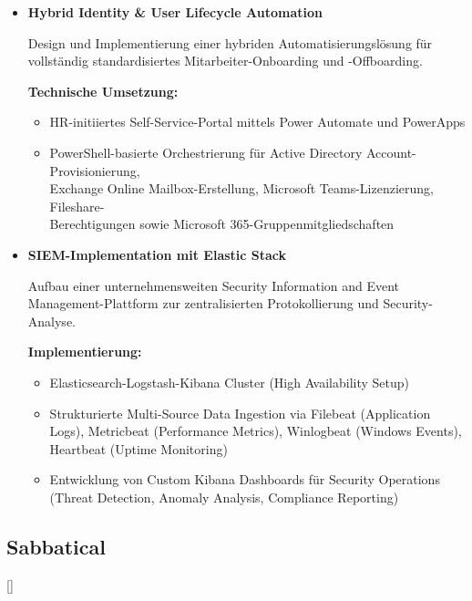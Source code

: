 \documentclass{cv}
\begin{document}
\begin{itemize}[leftmargin=*]
\begin{itemize}[nosep]
    \item \textbf{Analytics:} Azure Monitor Workbooks und Logic Apps zur Erstellung von Compliance-Dashboards und proaktiven Alerting-Workflows
\end{itemize}
\vspace{0.3cm}

\item \textbf{Hybrid Identity \& User Lifecycle Automation}

Design und Implementierung einer hybriden Automatisierungslösung für vollständig standardisiertes Mitarbeiter-Onboarding und -Offboarding.

\smallskip
\textbf{Technische Umsetzung:}
\begin{itemize}[nosep]
    \item HR-initiiertes Self-Service-Portal mittels Power Automate und PowerApps
    \item PowerShell-basierte Orchestrierung für Active Directory Account-Provisionierung,\\Exchange Online Mailbox-Erstellung, Microsoft Teams-Lizenzierung, Fileshare-\\Berechtigungen sowie Microsoft 365-Gruppenmitgliedschaften
\end{itemize}

\vspace{0.3cm}

\item \textbf{SIEM-Implementation mit Elastic Stack}

Aufbau einer unternehmensweiten Security Information and Event Management-Plattform zur zentralisierten Protokollierung und Security-Analyse.

\smallskip
\textbf{Implementierung:}
\begin{itemize}[nosep]
    \item Elasticsearch-Logstash-Kibana Cluster (High Availability Setup)
    \item Strukturierte Multi-Source Data Ingestion via Filebeat (Application Logs), Metricbeat (Performance Metrics), Winlogbeat (Windows Events), Heartbeat (Uptime Monitoring)
    \item Entwicklung von Custom Kibana Dashboards für Security Operations (Threat Detection, Anomaly Analysis, Compliance Reporting)
\end{itemize}


\end{itemize}

\subsection{Sabbatical}[]
\begin{positions}
\end{positions}
\end{document}
